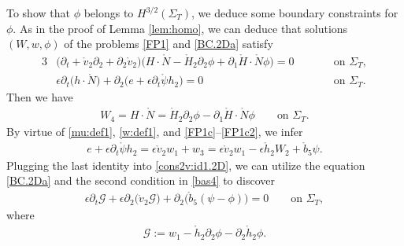 \documentclass[twoside,11pt]{article}
\numberwithin{equation}{section}
\def\p{\partial}
\begin{document}
To show  that  $\phi$ belongs to $H^{3/2}(\Sigma_T)$, we deduce some boundary constraints for $\phi$.
As in the proof of Lemma \ref{lem:homo}, we can deduce that
solutions $(W,w, \phi)$ of the problems \eqref{FP1} and \eqref{BC.2Da} satisfy
\begin{alignat}{3}
&\big(\p_t+\mathring{v}_2\p_2+\p_2\mathring{v}_2\big)\big(H\cdot\mathring{N}-\mathring{H}_2\p_2\phi+\p_1\mathring{H}\cdot\mathring{N}\phi \big)=0
 \qquad &&\textrm{on } \Sigma_T,	\\[1mm]
	\label{cons2v:id1.2D}
&	\epsilon \p_t\big(h\cdot \mathring{N}\big)
	+\p_2\big(e +\epsilon \p_t\mathring{\psi} h_2\big)
	=0
	\qquad&&\textrm{on } \Sigma_{T}.
\end{alignat}
Then we have %
\begin{align} \label{psi:id1}
	W_4=H\cdot\mathring{N}=\mathring{H}_2\p_2\phi-\p_1\mathring{H}\cdot\mathring{N}\phi \qquad \textrm{on } \Sigma_{T}.
\end{align}
By virtue of %
\eqref{mu:def1}, \eqref{w:def1}, and \eqref{FP1c}--\eqref{FP1c2},
we infer
\begin{align}
	e +\epsilon \p_t\mathring{\psi} h_2
	=\epsilon \mathring{v}_2 w_1 +w_3
	= \epsilon \mathring{v}_2 w_1-\epsilon \mathring{h}_2 W_2 +\mathring{b}_5 \psi.
	\nonumber
\end{align}
Plugging the last identity into \eqref{cons2v:id1.2D}, we can utilize the equation \eqref{BC.2Da} and the second condition in \eqref{bas4} to discover
\begin{align} \label{G.cal:eq}
	\epsilon\p_t \mathcal{G}+\epsilon\p_2\big(\mathring{v}_2 \mathcal{G} \big)
	+\p_2\big(\mathring{b}_5 (\psi-\phi)\big)=0 \qquad \textrm{on } \Sigma_{T},
\end{align}
where
\begin{align} \label{G.cal:def}
	\mathcal{G}:=w_1-\mathring{h}_2\p_2 \phi -\p_2\mathring{h}_2\phi .
\end{align}
\end{document}
